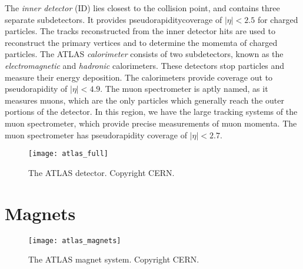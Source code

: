 The \textit{inner detector} (ID) lies closest to the collision point, and contains three separate subdetectors.
It provides pseudorapidity\footnotemark coverage of $|\eta| < 2.5$ for charged particles.
The tracks reconstructed from the inner detector hits are used to reconstruct the primary vertices and to determine the momemta of charged particles.
The ATLAS \textit{calorimeter} consists of two subdetectors, known as the \textit{electromagnetic} and \textit{hadronic} calorimeters.
These detectors stop particles and measure their energy deposition.
The calorimeters provide coverage out to pseudorapidity of $|\eta| < 4.9$.
The muon spectrometer is aptly named, as it measures  muons, which are the only particles which generally reach the outer portions of the detector.
In this region, we have the large tracking systems of the muon spectrometer, which provide precise measurements of muon momenta.
The muon spectrometer has pseudorapidity coverage of $|\eta| < 2.7$.

\begin{figure}[tbp]
\caption{The ATLAS detector. Copyright CERN.} \label{fig:atlas_full}
\texttt{[image: atlas\_full]}
\end{figure}

\section{Magnets}

\begin{figure}[tbp]
\caption{The ATLAS magnet system. Copyright CERN.} \label{fig:atlas_magnets}
\texttt{[image: atlas\_magnets]}
\end{figure}

